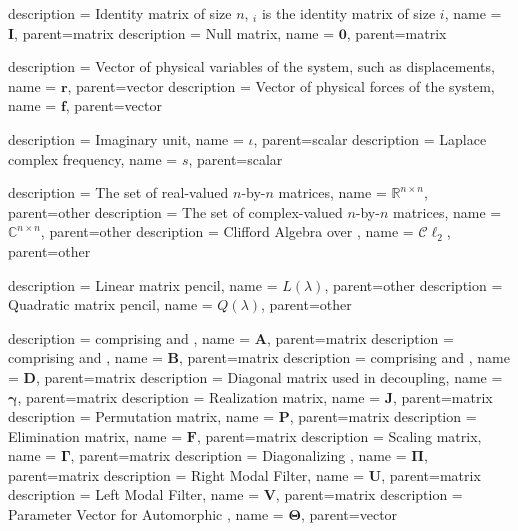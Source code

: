 {
	description = {Identity matrix of size  \ensuremath{n}, \ensuremath{_i} is the identity matrix of size \ensuremath{i}}, 
	name = {\ensuremath{\mathbf{I}}},
	parent=matrix
}
{
	description = {Null matrix}, 
	name = {\ensuremath{\mathbf{0}}},
	parent=matrix
}


{
	description = {Vector of physical variables of the system, such as displacements}, 
	name = {\ensuremath{\mathbf{r}}},
	parent=vector
}
{
	description = {Vector of physical forces of the system}, 
	name = {\ensuremath{\mathbf{f}}},
	parent=vector
}


{
	description = {Imaginary unit}, 
	name = {\ensuremath{\iota}},
	parent=scalar
}
{
	description = {Laplace complex frequency}, 
	name = {\ensuremath{s}},
	parent=scalar
}


{
	description = {The set of real-valued \ensuremath{n}-by-\ensuremath{n} matrices}, 
	name = {\ensuremath{\mathbb{R}^{n\times n}}},
	parent=other
}
{
	description = {The set of complex-valued \ensuremath{n}-by-\ensuremath{n} matrices}, 
	name = {\ensuremath{\mathbb{C}^{n\times n}}},
	parent=other
}
{
	description = {Clifford Algebra over }, 
	name = {\ensuremath{\mathcal{C}\ell_2}},
	parent=other
}


{
	description = {Linear matrix pencil}, 
	name = {\ensuremath{L(\lambda)}},
	parent=other
}
{
	description = {Quadratic matrix pencil}, 
	name = {\ensuremath{Q(\lambda)}},
	parent=other
}


{
	description = { comprising  and }, 
	name = {\ensuremath{\mathbf{A}}},
	parent=matrix
}
{
	description = { comprising  and }, 
	name = {\ensuremath{\mathbf{B}}},
	parent=matrix
}
{
	description = { comprising  and }, 
	name = {\ensuremath{\mathbf{D}}},
	parent=matrix
}
{
	description = {Diagonal matrix used in decoupling}, 
	name = {\ensuremath{\mathbf{\gamma}}},
	parent=matrix
}
{
	description = {Realization matrix}, 
	name = {\ensuremath{\mathbf{J}}},
	parent=matrix
}
{
	description = {Permutation matrix}, 
	name = {\ensuremath{\mathbf{P}}},
	parent=matrix
}
{
	description = {Elimination matrix}, 
	name = {\ensuremath{\mathbf{F}}},
	parent=matrix
}
{
	description = {Scaling matrix}, 
	name = {\ensuremath{\mathbf{\Gamma}}},
	parent=matrix
}
{
	description = {Diagonalizing }, 
	name = {\ensuremath{\mathbf{\Pi}}},
	parent=matrix
}
{
	description = {Right Modal Filter}, 
	name = {\ensuremath{\mathbf{U}}},
	parent=matrix
}
{
	description = {Left Modal Filter}, 
	name = {\ensuremath{\mathbf{V}}},
	parent=matrix
}
{
	description = {Parameter Vector for Automorphic },
	name = {\ensuremath{\mathbf{\Theta}}},
	parent=vector
}

